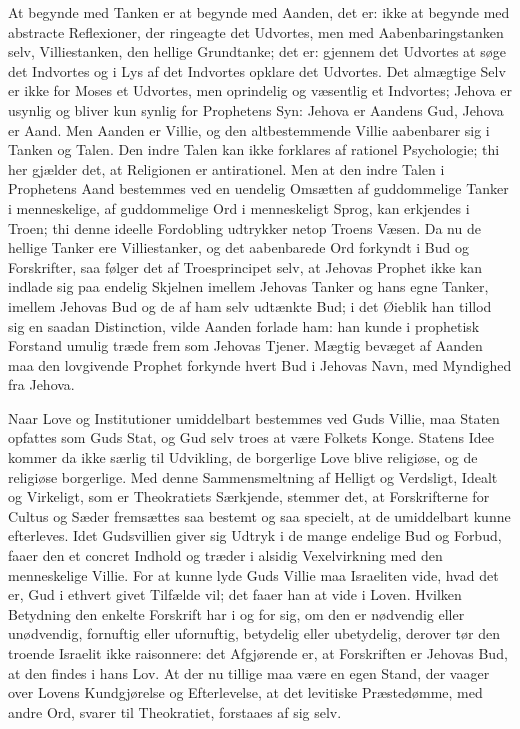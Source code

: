 \documentclass[12pt]{book}
\begin{document}
At begynde med Tanken er at begynde med Aanden, det er: ikke at
begynde med abstracte Reflexioner, der ringeagte det Udvortes, men
med Aabenbaringstanken selv, Villiestanken, den hellige Grundtanke;
det er: gjennem det Udvortes at søge det Indvortes og i Lys af det
Indvortes opklare det Udvortes. Det almægtige Selv er ikke for Moses
et Udvortes, men oprindelig og væsentlig et Indvortes; Jehova er
usynlig og bliver kun synlig for
Prophetens Syn: Jehova er Aandens Gud, Jehova er Aand. Men Aanden er
Villie, og den altbestemmende Villie aabenbarer sig i Tanken og
Talen. Den indre Talen kan ikke forklares af rationel Psychologie;
thi her gjælder det, at Religionen er antirationel. Men at den indre
Talen i Prophetens Aand bestemmes ved en uendelig Omsætten af
guddommelige Tanker i menneskelige, af guddommelige Ord i
menneskeligt Sprog, kan erkjendes i Troen; thi denne ideelle
Fordobling udtrykker netop Troens Væsen. Da nu de hellige Tanker ere
Villiestanker, og det aabenbarede Ord forkyndt i Bud og Forskrifter,
saa følger det af Troesprincipet selv, at Jehovas Prophet ikke kan
indlade sig paa endelig Skjelnen imellem Jehovas Tanker og hans egne
Tanker, imellem Jehovas Bud og de af ham selv udtænkte Bud; i det
Øieblik han tillod sig en saadan Distinction, vilde Aanden forlade
ham: han kunde i prophetisk Forstand umulig træde frem som Jehovas
Tjener. Mægtig bevæget af Aanden maa den lovgivende Prophet forkynde
hvert Bud i Jehovas Navn, med Myndighed fra Jehova.

Naar Love og Institutioner umiddelbart bestemmes ved Guds Villie,
maa Staten opfattes som Guds Stat, og Gud selv troes at være Folkets
Konge. Statens Idee kommer da ikke særlig til Udvikling, de
borgerlige Love blive religiøse, og de religiøse borgerlige. Med
denne Sammensmeltning af Helligt og Verdsligt, Idealt og Virkeligt,
som er Theokratiets Særkjende, stemmer det, at Forskrifterne for
Cultus og Sæder fremsættes saa bestemt og saa specielt, at de
umiddelbart kunne efterleves. Idet Gudsvillien giver sig Udtryk i de
mange endelige Bud og Forbud, faaer den et concret Indhold og træder
i alsidig Vexelvirkning med den menneskelige Villie. For at kunne
lyde Guds Villie maa Israeliten vide, hvad det er, Gud i ethvert
givet Tilfælde vil; det faaer han at vide i Loven. Hvilken Betydning
den enkelte Forskrift
har i og for sig, om den er nødvendig eller unødvendig, fornuftig
eller ufornuftig, betydelig eller ubetydelig, derover tør den
troende Israelit ikke raisonnere: det Afgjørende er, at Forskriften
er Jehovas Bud, at den findes i hans Lov. At der nu tillige maa være
en egen Stand, der vaager over Lovens Kundgjørelse og Efterlevelse,
at det levitiske Præstedømme, med andre Ord, svarer til Theokratiet,
forstaaes af sig selv.
\end{document}
